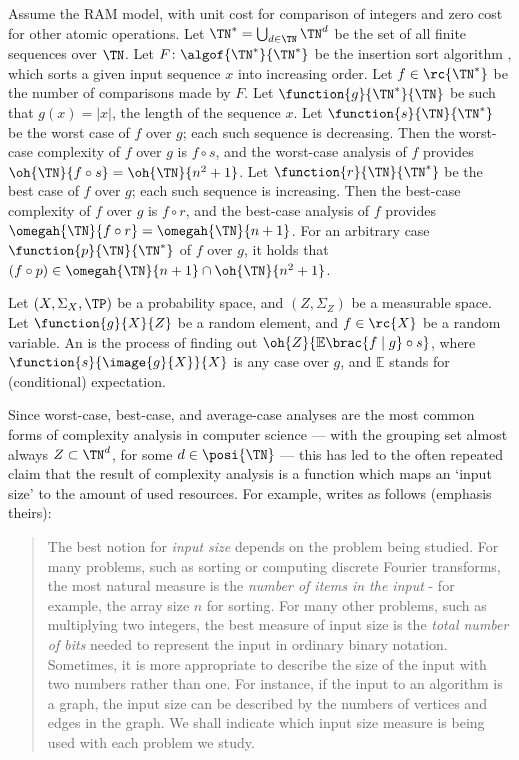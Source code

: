 \documentclass[b5paper, english, oneside]{memoir}
\begin{document}
\begin{example}
Assume the RAM model, with unit cost for comparison of integers and zero cost for other atomic operations. Let $\TN^* = \bigcup_{d \in \TN} \TN^d$ be the set of all finite sequences over $\TN$. Let $F \colon \algof{\TN^*}{\TN^*}$ be the insertion sort algorithm \cite{IntroAlgo2009}, which sorts a given input sequence $x$ into increasing order. Let $f \in \rc{\TN^*}$ be the number of comparisons made by $F$. Let $\function{g}{\TN^*}{\TN}$ be such that $g(x) = |x|$, the length of the sequence $x$. Let $\function{s}{\TN}{\TN^*}$ be the worst case of $f$ over $g$; each such sequence is decreasing. Then the worst-case complexity of $f$ over $g$ is $f \circ s$, and the worst-case analysis of $f$ provides $\oh{\TN}{f \circ s} = \oh{\TN}{n^2 + 1}$. Let $\function{r}{\TN}{\TN^*}$ be the best case of $f$ over $g$; each such sequence is increasing. Then the best-case complexity of $f$ over $g$ is $f \circ r$, and the best-case analysis of $f$ provides $\omegah{\TN}{f \circ r} = \omegah{\TN}{n + 1}$. For an arbitrary case $\function{p}{\TN}{\TN^*}$ of $f$ over $g$, it holds that $(f \circ p) \in \omegah{\TN}{n + 1} \cap \oh{\TN}{n^2 + 1}$.
\end{example}

\begin{definition}
Let $(X, \Sigma_X, \TP)$ be a probability space, and $(Z, \Sigma_Z)$ be a measurable space. Let $\function{g}{X}{Z}$ be a random element, and $f \in \rc{X}$ be a random variable. An  is the process of finding out $\oh{Z}{\mathbb{E}\brac{f \; | \; g} \circ s}$, where $\function{s}{\image{g}{X}}{X}$ is any case over $g$, and $\mathbb{E}$ stands for (conditional) expectation.
\end{definition}

Since worst-case, best-case, and average-case analyses are the most common forms of complexity analysis in computer science --- with the grouping set almost always $Z \subset \TN^d$, for some $d \in \posi{\TN}$ --- this has led to the often repeated claim that the result of complexity analysis is a function which maps an `input size' to the amount of used resources. For example, \cite[page 25]{IntroAlgo2009} writes as follows (emphasis theirs):
\begin{quotation}
\noindent
The best notion for \emph{input size} depends on the problem being studied. For many problems, such as sorting or computing discrete Fourier transforms, the most natural measure is the \emph{number of items in the input} - for example, the array size $n$ for sorting. For many other problems, such as multiplying two integers, the best measure of input size is the \emph{total number of bits} needed to represent the input in ordinary binary notation. Sometimes, it is more appropriate to describe the size of the input with two numbers rather than one. For instance, if the input to an algorithm is a graph, the input size can be described by the numbers of vertices and edges in the graph. We shall indicate which input size measure is being used with each problem we study.
\end{quotation}
\end{document}
